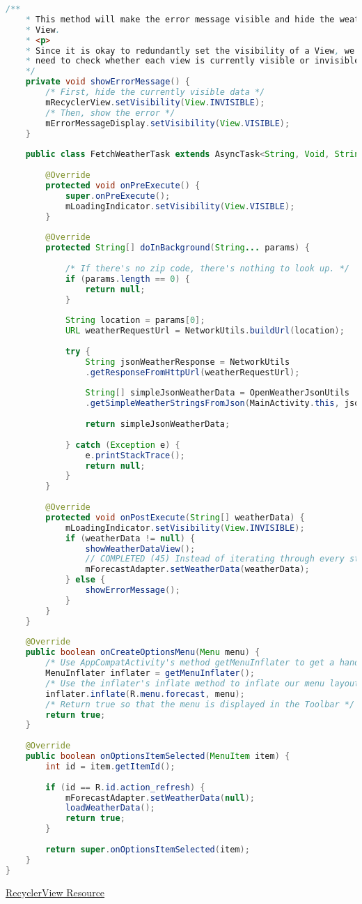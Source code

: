 \documentclass[12pt]{article} %
\begin{document}
\begin{lstlisting}[language=Java]
	/**
	* This method will make the error message visible and hide the weather
	* View.
	* <p>
	* Since it is okay to redundantly set the visibility of a View, we don't
	* need to check whether each view is currently visible or invisible.
	*/
	private void showErrorMessage() {
		/* First, hide the currently visible data */
		mRecyclerView.setVisibility(View.INVISIBLE);
		/* Then, show the error */
		mErrorMessageDisplay.setVisibility(View.VISIBLE);
	}
	
	public class FetchWeatherTask extends AsyncTask<String, Void, String[]> {
		
		@Override
		protected void onPreExecute() {
			super.onPreExecute();
			mLoadingIndicator.setVisibility(View.VISIBLE);
		}
		
		@Override
		protected String[] doInBackground(String... params) {
			
			/* If there's no zip code, there's nothing to look up. */
			if (params.length == 0) {
				return null;
			}
			
			String location = params[0];
			URL weatherRequestUrl = NetworkUtils.buildUrl(location);
			
			try {
				String jsonWeatherResponse = NetworkUtils
				.getResponseFromHttpUrl(weatherRequestUrl);
				
				String[] simpleJsonWeatherData = OpenWeatherJsonUtils
				.getSimpleWeatherStringsFromJson(MainActivity.this, jsonWeatherResponse);
				
				return simpleJsonWeatherData;
				
			} catch (Exception e) {
				e.printStackTrace();
				return null;
			}
		}
		
		@Override
		protected void onPostExecute(String[] weatherData) {
			mLoadingIndicator.setVisibility(View.INVISIBLE);
			if (weatherData != null) {
				showWeatherDataView();
				// COMPLETED (45) Instead of iterating through every string, use mForecastAdapter.setWeatherData and pass in the weather data
				mForecastAdapter.setWeatherData(weatherData);
			} else {
				showErrorMessage();
			}
		}
	}
	
	@Override
	public boolean onCreateOptionsMenu(Menu menu) {
		/* Use AppCompatActivity's method getMenuInflater to get a handle on the menu inflater */
		MenuInflater inflater = getMenuInflater();
		/* Use the inflater's inflate method to inflate our menu layout to this menu */
		inflater.inflate(R.menu.forecast, menu);
		/* Return true so that the menu is displayed in the Toolbar */
		return true;
	}
	
	@Override
	public boolean onOptionsItemSelected(MenuItem item) {
		int id = item.getItemId();
		
		if (id == R.id.action_refresh) {
			mForecastAdapter.setWeatherData(null);
			loadWeatherData();
			return true;
		}
		
		return super.onOptionsItemSelected(item);
	}
}
\end{lstlisting}
\href{https://developer.android.com/reference/android/support/v7/widget/RecyclerView.html}{RecyclerView Resource}
\end{document}
